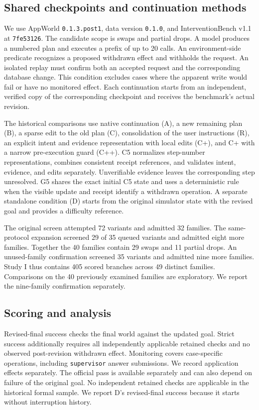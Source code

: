 \documentclass[conference]{IEEEtran}
\begin{document}
\subsection{Shared checkpoints and continuation methods}
We use AppWorld \texttt{0.1.3.post1}, data version \texttt{0.1.0}, and InterventionBench v1.1 at \texttt{7fe53126}. The candidate scope is swaps and partial drops. A model produces a numbered plan and executes a prefix of up to 20 calls. An environment-side predicate recognizes a proposed withdrawn effect and withholds the request. An isolated replay must confirm both an accepted request and the corresponding database change. This condition excludes cases where the apparent write would fail or have no monitored effect. Each continuation starts from an independent, verified copy of the corresponding checkpoint and receives the benchmark's actual revision.

The historical comparisons use native continuation (A), a new remaining plan (B), a sparse edit to the old plan (C), consolidation of the user instructions (R), an explicit intent and evidence representation with local edits (C+), and C+ with a narrow pre-execution guard (C++). C5 normalizes step-number representations, combines consistent receipt references, and validates intent, evidence, and edits separately. Unverifiable evidence leaves the corresponding step unresolved. G5 shares the exact initial C5 state and uses a deterministic rule when the visible update and receipt identify a withdrawn operation. A separate standalone condition (D) starts from the original simulator state with the revised goal and provides a difficulty reference.

The original screen attempted 72 variants and admitted 32 families. The same-protocol expansion screened 29 of 35 queued variants and admitted eight more families. Together the 40 families contain 29 swaps and 11 partial drops. An unused-family confirmation screened 35 variants and admitted nine more families. Study I thus contains 405 scored branches across 49 distinct families. Comparisons on the 40 previously examined families are exploratory. We report the nine-family confirmation separately.

\subsection{Scoring and analysis}
Revised-final success checks the final world against the updated goal. Strict success additionally requires all independently applicable retained checks and no observed post-revision withdrawn effect. Monitoring covers case-specific operations, including \texttt{supervisor} answer submissions. We record application effects separately. The official pass is available separately and can also depend on failure of the original goal. No independent retained checks are applicable in the historical formal sample. We report D's revised-final success because it starts without interruption history.
\end{document}
